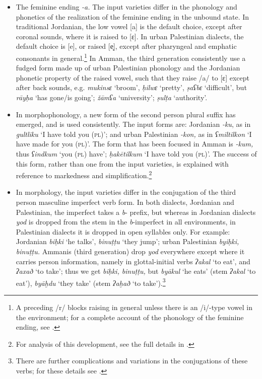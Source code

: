 \documentclass[output=paper]{langsci/langscibook}
\begin{document}
\begin{itemize}

\item[]
The feminine ending \textit{{}-a.} The input varieties differ in the phonology and phonetics of the realization of the feminine ending in the unbound state. In traditional Jordanian, the low vowel [a] is the default choice, except after coronal sounds, where it is raised to [ɛ]. In urban Palestinian dialects, the default choice is [e], or raised [e̝], except after pharyngeal and emphatic consonants in general.\footnote{A preceding /r/ blocks raising in general unless there is an /i/-type vowel in the environment; for a complete account of the phonology of the feminine ending, see \citet{Al-WerEtAl2015}.} In Amman, the third generation consistently use a fudged form made up of urban Palestinian phonology and the Jordanian phonetic property of the raised vowel, such that they raise /a/ to [ɛ] except after back sounds, e.g. \textit{mukinsɛ} ‘broom', \textit{ḥilwɛ} ‘pretty’, \textit{ṣaʕbɛ} ‘difficult’, but \textit{rāyḥa} ‘has gone/is going’; \textit{žāmʕa} ‘university’; \textit{ṣulṭa} ‘authority’.

\item[]In morphophonology, a new form of the second person plural suffix has emerged, and is used consistently. The input forms are: Jordanian \textit{{}-ku}, as in \textit{gultliku} ‘I have told you (\textsc{pl})’; and urban Palestinian \textit{{}-kon,} as in \textit{ʕmiltilkon} ‘I have made for you (\textsc{pl})’. The form that has been focused in Amman is \textit{{}-kum,} thus \textit{ʕindkum} ‘you (\textsc{pl}) have’; \textit{ḥakētilkum} ‘I have told you (\textsc{pl)}’. The success of this form, rather than one from the input varieties, is explained with reference to markedness and simplification.\footnote{For analysis of this development, see the full details in \citet{Al-Wer2003kum}.}

\item[]In morphology, the input varieties differ in the conjugation of the third person masculine imperfect verb form. In both dialects, Jordanian and Palestinian, the imperfect takes a \textit{b}{}- prefix, but whereas in Jordanian dialects \textit{yod} is dropped from the stem in the \textit{b}{}-imperfect in all environments, in Palestinian dialects it is dropped in open syllables only. For example: Jordanian \textit{biḥki} ‘he talks’, \textit{binuṭṭu} ‘they jump’; urban Palestinian \textit{byiḥki,} \textit{binuṭṭu.} Ammanis (third generation) drop \textit{yod} everywhere except where it carries person information, namely in glottal-initial verbs \textit{ʔakal} ‘to eat’, and \textit{ʔaxað} ‘to take’; thus we get \textit{biḥki,} \textit{binuṭṭu,} but \textit{byākul} ‘he eats’ (stem \textit{ʔakal} ‘to eat’), \textit{byāḫdu} ‘they take’ (stem \textit{ʔaḫað} ‘to take’).\footnote{There are further complications and variations in the conjugations of these verbs; for these details see \citet{Al-Wer2014}.}
\end{itemize}
\end{document}
